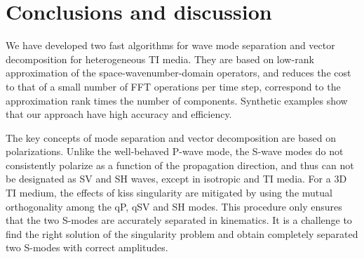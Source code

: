 \section{Conclusions and discussion}
We have developed two fast algorithms for wave mode separation and vector decomposition for heterogeneous TI media.
They are based on  low-rank approximation of the space-wavenumber-domain operators, and reduces the 
cost to that of a small number of FFT operations per time step,  correspond to the approximation rank times
the number of components. Synthetic examples show that our approach have high accuracy and efficiency.

The key concepts of mode separation and vector decomposition are based on polarizations. Unlike the well-behaved
P-wave mode, the S-wave modes do not consistently polarize as a function of the propagation direction,
and thus can not be designated as SV and SH waves, except in isotropic and TI media. For a 3D TI medium,
the effects of kiss singularity are mitigated by using the mutual orthogonality among the qP, qSV and SH modes.
This procedure only ensures that the two S-modes are accurately separated in kinematics.
It is a challenge to find the right solution of the singularity problem and obtain completely separated 
two S-modes with correct amplitudes.
